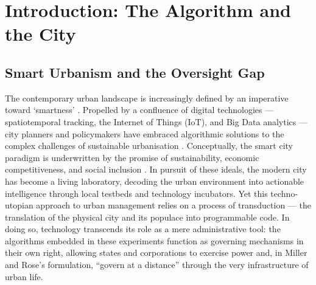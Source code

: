 \documentclass[12pt,a4paper,twoside]{report}
\begin{document}
\tableofcontents
\newpage


\chapter{Introduction: The Algorithm and the City}
\label{ch:introduction}

\section{Smart Urbanism and the Oversight Gap}
\label{sec:smart-urbanism}

The contemporary urban landscape is increasingly defined by an imperative toward `smartness' \parencite{cugurullo2024}. Propelled by a confluence of digital technologies — spatiotemporal tracking, the Internet of Things (IoT), and Big Data analytics — city planners and policymakers have embraced algorithmic solutions to the complex challenges of sustainable urbanisation \parencite{kitchin2014,townsend2013}. Conceptually, the smart city paradigm is underwritten by the promise of sustainability, economic competitiveness, and social inclusion \parencite{arroub2016}. In pursuit of these ideals, the modern city has become a living laboratory, decoding the urban environment into actionable intelligence through local testbeds and technology incubators. Yet this techno-utopian approach to urban management relies on a process of transduction — the translation of the physical city and its populace into programmable code. In doing so, technology transcends its role as a mere administrative tool: the algorithms embedded in these experiments function as governing mechanisms in their own right, allowing states and corporations to exercise power and, in Miller and Rose's \citeyearpar[p.~18]{miller1990} formulation, ``govern at a distance'' through the very infrastructure of urban life.
\end{document}
